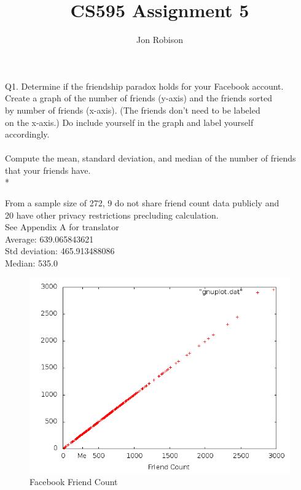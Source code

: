 \documentclass{article}
\begin{document}
\author{Jon Robison}
\title{CS595 Assignment 5}
\maketitle

Q1.  Determine if the friendship paradox holds for your Facebook account.\\
Create a graph of the number of friends (y-axis) and the friends sorted\\
by number of friends (x-axis).  (The friends don't need to be labeled \\
on the x-axis.)  Do include yourself in the graph and label yourself\\
accordingly.\\
\\
Compute the mean, standard deviation, and median of the number of friends\\
that your friends have. \\*

From a sample size of 272, 9 do not share friend count data publicly and\\
20 have other privacy restrictions precluding calculation.\\

See Appendix A for translator\\
Average: 639.065843621 \\
Std deviation: 465.913488086 \\
Median: 535.0 \\
\graphicspath{{q1/}}
\begin{figure}[H]
  \centering
  \caption{Facebook Friend Count}
  \includegraphics[scale=.45]{scatter.png}
\end{figure}
\clearpage
\end{document}
